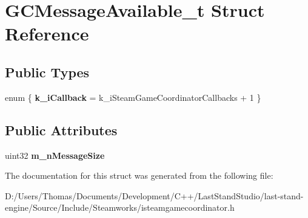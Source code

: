 \hypertarget{structGCMessageAvailable__t}{}\section{G\+C\+Message\+Available\+\_\+t Struct Reference}
\label{structGCMessageAvailable__t}
\subsection*{Public Types}
\begin{DoxyCompactItemize}
\item 
\hypertarget{structGCMessageAvailable__t_a9ad838f78fe02a3bbe5ef99cd3507498}{}enum \{ {\bfseries k\+\_\+i\+Callback} = k\+\_\+i\+Steam\+Game\+Coordinator\+Callbacks + 1
 \}\label{structGCMessageAvailable__t_a9ad838f78fe02a3bbe5ef99cd3507498}

\end{DoxyCompactItemize}
\subsection*{Public Attributes}
\begin{DoxyCompactItemize}
\item 
\hypertarget{structGCMessageAvailable__t_a37d105524801455b732ae9fbbc660360}{}uint32 {\bfseries m\+\_\+n\+Message\+Size}\label{structGCMessageAvailable__t_a37d105524801455b732ae9fbbc660360}

\end{DoxyCompactItemize}


The documentation for this struct was generated from the following file\+:\begin{DoxyCompactItemize}
\item 
D\+:/\+Users/\+Thomas/\+Documents/\+Development/\+C++/\+Last\+Stand\+Studio/last-\/stand-\/engine/\+Source/\+Include/\+Steamworks/isteamgamecoordinator.\+h\end{DoxyCompactItemize}
